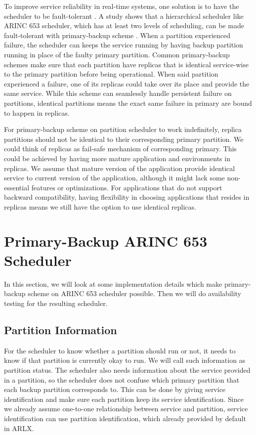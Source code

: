 \documentclass[conference]{IEEEtran}
\begin{document}
To improve service reliability in real-time systems, one solution is to have the scheduler to be
fault-tolerant \cite{Campbell1986} \cite{Han2003} \cite{Shin2008}. A study shows that a
hierarchical scheduler like ARINC 653 scheduler, which has at least two levels of scheduling,
can be made fault-tolerant with primary-backup scheme \cite{Jin2013}. When a partition
experienced failure, the scheduler can keeps the service running by having backup partition
running in place of the faulty primary partition. Common primary-backup schemes make sure that
each partition have replicas that is identical service-wise to the primary partition before
being operational. When said partition experienced a failure, one of its replicas could take
over its place and provide the same service. While this scheme can seamlessly handle persistent
failure on partitions, identical partitions means the exact same failure in primary are bound to
happen in replicas.

For primary-backup scheme on partition scheduler to work indefinitely, replica partitions should
not be identical to their corresponding primary partition. We could think of replicas as
fail-safe mechanism of corresponding primary. This could be achieved by having more mature
application and environments in replicas. We assume that mature version of the application
provide identical service to current version of the application, although it might lack some
non-essential features or optimizations. For applications that do not support backward
compatibility, having flexibility in choosing applications that resides in replicas means we
still have the option to use identical replicas.

\section{Primary-Backup ARINC 653 Scheduler}

In this section, we will look at some implementation details which make primary-backup scheme on
ARINC 653 scheduler possible. Then we will do availability testing for the resulting scheduler.

\subsection{Partition Information}

For the scheduler to know whether a partition should run or not, it needs to know if that
partition is currently okay to run. We will call such information as partition status. The
scheduler also needs information about the service provided in a partition, so the scheduler
does not confuse which primary partition that each backup partition corresponds to. This can be
done by giving service identification and make sure each partition keep its service
identification. Since we already assume one-to-one relationship between service and partition,
service identification can use partition identification, which already provided by default in
ARLX.
\end{document}
